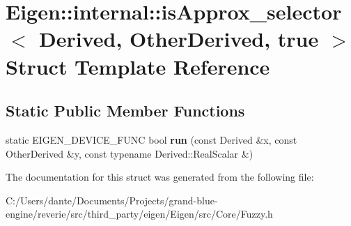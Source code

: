 \hypertarget{struct_eigen_1_1internal_1_1is_approx__selector_3_01_derived_00_01_other_derived_00_01true_01_4}{}\section{Eigen\+::internal\+::is\+Approx\+\_\+selector$<$ Derived, Other\+Derived, true $>$ Struct Template Reference}
\label{struct_eigen_1_1internal_1_1is_approx__selector_3_01_derived_00_01_other_derived_00_01true_01_4}
\subsection*{Static Public Member Functions}
\begin{DoxyCompactItemize}
\item 
\mbox{\label{struct_eigen_1_1internal_1_1is_approx__selector_3_01_derived_00_01_other_derived_00_01true_01_4_ad84f8989be5b6aef5fd1c859cea69050}} 
static E\+I\+G\+E\+N\+\_\+\+D\+E\+V\+I\+C\+E\+\_\+\+F\+U\+NC bool {\bfseries run} (const Derived \&x, const Other\+Derived \&y, const typename Derived\+::\+Real\+Scalar \&)
\end{DoxyCompactItemize}


The documentation for this struct was generated from the following file\+:\begin{DoxyCompactItemize}
\item 
C\+:/\+Users/dante/\+Documents/\+Projects/grand-\/blue-\/engine/reverie/src/third\+\_\+party/eigen/\+Eigen/src/\+Core/Fuzzy.\+h\end{DoxyCompactItemize}

